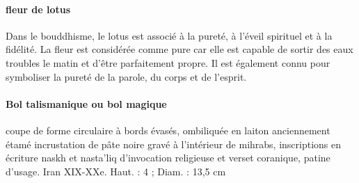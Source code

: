 \paragraph{fleur de lotus} Dans le bouddhisme, le lotus est associé à la pureté, à l’éveil spirituel et à la fidélité. La fleur est considérée comme pure car elle est capable de sortir des eaux troubles le matin et d’être parfaitement propre. Il est également connu pour symboliser la pureté de la parole, du corps et de l’esprit.


\paragraph{Bol talismanique ou bol magique} coupe de forme circulaire à bords évasés, ombiliquée en laiton anciennement étamé incrustation de pâte noire gravé à l'intérieur de mihrabs, inscriptions en écriture naskh et nasta'liq d'invocation religieuse et verset coranique, patine d'usage. Iran XIX-XXe.
Haut. : 4 ; Diam. : 13,5 cm


